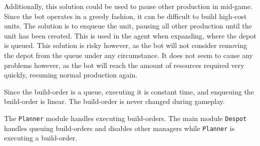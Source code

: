 Additionally, this solution could be used to pause other production in mid-game. Since the bot operates in a greedy fashion, it can be difficult to build high-cost units. The solution is to enqueue the unit, pausing all other production until the unit has been created. This is used in the agent when expanding, where the depot is queued. This solution is risky however, as the bot will not consider removing the depot from the queue under any circumstance. It does not seem to cause any problems however, as the bot will reach the amount of resources required very quickly, resuming normal production again.

Since the build-order is a queue, executing it is constant time, and enqueuing the build-order is linear. The build-order is never changed during gameplay.

The \texttt{Planner} module handles executing build-orders. The main module \texttt{Despot} handles queuing build-orders and disables other managers while \texttt{Planner} is executing a build-order.